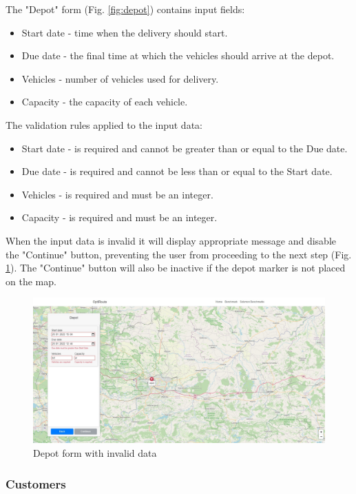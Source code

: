 \documentclass[a4paper,twoside,12pt]{book}
\begin{document}
The "Depot" form (Fig. \ref{fig:depot}) contains input fields:
\begin{itemize}
    \item Start date - time when the delivery should start.
    \item Due date - the final time at which the vehicles should arrive at the depot.
    \item Vehicles - number of vehicles used for delivery.
    \item Capacity - the capacity of each vehicle.
\end{itemize}



The validation rules applied to the input data:
\begin{itemize}
    \item Start date - is required and cannot be greater than or equal to the Due date.
    \item Due date - is required and cannot be less than or equal to the Start date.
    \item Vehicles - is required and must be an integer.
    \item Capacity - is required and must be an integer.
\end{itemize}
When the input data is invalid it will display appropriate message and disable the "Continue" button, preventing the user from proceeding to the next step (Fig. \ref{fig:invalidDepot}). The "Continue" button will also be inactive if the depot marker is not placed on the map.
\begin{figure}[H]
\centering
\includegraphics[width=\textwidth]{images/invalidDepot.jpg}
\caption{Depot form with invalid data}
\label{fig:invalidDepot}
\end{figure}



\subsubsection{Customers}
\end{document}

